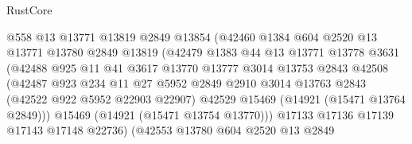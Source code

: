 \begin{lexlean}{RustCore}
\begin{coremodule}
                              @558
                              @13
                              @13771
                              @13819
                              @2849
                              @13854
                              (@42460
                                @1384
                                @604
                                @2520
                                @13
                                @13771
                                @13780
                                @2849
                                @13819
                                (@42479
                                  @1383
                                  @44
                                  @13
                                  @13771
                                  @13778
                                  @3631
                                  (@42488
                                    @925
                                    @11
                                    @41
                                    @3617
                                    @13770
                                    @13777
                                    @3014
                                    @13753
                                    @2843
                                    @42508
                                    (@42487
                                      @923
                                      @234
                                      @11
                                      @27
                                      @5952
                                      @2849
                                      @2910
                                      @3014
                                      @13763
                                      @2843
                                      (@42522 @922 @5952 @22903 @22907)
                                      @42529
                                      @15469
                                      (@14921 (@15471 @13764 @2849)))
                                    @15469
                                    (@14921 (@15471 @13754 @13770)))
                                  @17133
                                  @17136
                                  @17139
                                  @17143
                                  @17148
                                  @22736)
                                (@42553
                                  @13780
                                  @604
                                  @2520
                                  @13
                                  @2849

\end{coremodule}
\end{lexlean}
